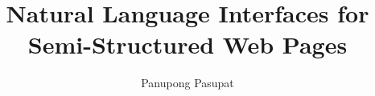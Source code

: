 \documentclass{report}
\begin{document}
\title{Natural Language Interfaces for Semi-Structured Web Pages}
\author{Panupong Pasupat}
 
\beforepreface

\afterpreface

%
%
%
%

%
%

\appendix



\end{document}
